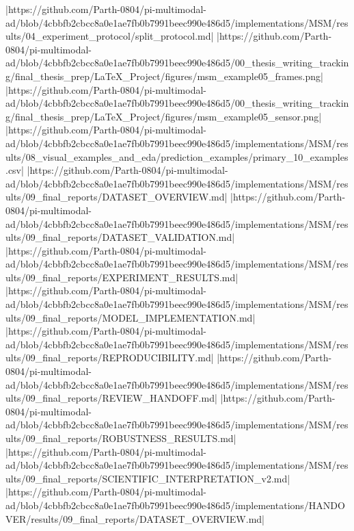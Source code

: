 |https://github.com/Parth-0804/pi-multimodal-ad/blob/4cbbfb2cbcc8a0e1ae7fb0b7991beec990e486d5/implementations/MSM/results/04_experiment_protocol/split_protocol.md|
|https://github.com/Parth-0804/pi-multimodal-ad/blob/4cbbfb2cbcc8a0e1ae7fb0b7991beec990e486d5/00_thesis_writing_tracking/final_thesis_prep/LaTeX_Project/figures/msm_example05_frames.png|
|https://github.com/Parth-0804/pi-multimodal-ad/blob/4cbbfb2cbcc8a0e1ae7fb0b7991beec990e486d5/00_thesis_writing_tracking/final_thesis_prep/LaTeX_Project/figures/msm_example05_sensor.png|
|https://github.com/Parth-0804/pi-multimodal-ad/blob/4cbbfb2cbcc8a0e1ae7fb0b7991beec990e486d5/implementations/MSM/results/08_visual_examples_and_eda/prediction_examples/primary_10_examples.csv|
|https://github.com/Parth-0804/pi-multimodal-ad/blob/4cbbfb2cbcc8a0e1ae7fb0b7991beec990e486d5/implementations/MSM/results/09_final_reports/DATASET_OVERVIEW.md|
|https://github.com/Parth-0804/pi-multimodal-ad/blob/4cbbfb2cbcc8a0e1ae7fb0b7991beec990e486d5/implementations/MSM/results/09_final_reports/DATASET_VALIDATION.md|
|https://github.com/Parth-0804/pi-multimodal-ad/blob/4cbbfb2cbcc8a0e1ae7fb0b7991beec990e486d5/implementations/MSM/results/09_final_reports/EXPERIMENT_RESULTS.md|
|https://github.com/Parth-0804/pi-multimodal-ad/blob/4cbbfb2cbcc8a0e1ae7fb0b7991beec990e486d5/implementations/MSM/results/09_final_reports/MODEL_IMPLEMENTATION.md|
|https://github.com/Parth-0804/pi-multimodal-ad/blob/4cbbfb2cbcc8a0e1ae7fb0b7991beec990e486d5/implementations/MSM/results/09_final_reports/REPRODUCIBILITY.md|
|https://github.com/Parth-0804/pi-multimodal-ad/blob/4cbbfb2cbcc8a0e1ae7fb0b7991beec990e486d5/implementations/MSM/results/09_final_reports/REVIEW_HANDOFF.md|
|https://github.com/Parth-0804/pi-multimodal-ad/blob/4cbbfb2cbcc8a0e1ae7fb0b7991beec990e486d5/implementations/MSM/results/09_final_reports/ROBUSTNESS_RESULTS.md|
|https://github.com/Parth-0804/pi-multimodal-ad/blob/4cbbfb2cbcc8a0e1ae7fb0b7991beec990e486d5/implementations/MSM/results/09_final_reports/SCIENTIFIC_INTERPRETATION_v2.md|
|https://github.com/Parth-0804/pi-multimodal-ad/blob/4cbbfb2cbcc8a0e1ae7fb0b7991beec990e486d5/implementations/HANDOVER/results/09_final_reports/DATASET_OVERVIEW.md|
